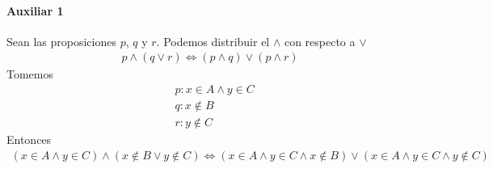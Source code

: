 \begin{enumerate}[label=\roman*)]
  \paragraph{Auxiliar 1}{
    Sean las proposiciones $p$, $q$ y $r$. Podemos distribuir el $\land$ con respecto a $\lor$
    \begin{align*}
      p \land (q \lor r) \iff (p \land q) \lor (p \land r)
    \end{align*}
    Tomemos 
    \begin{align*}
      &p: x \in A \land y \in C \\
      &q: x \notin B \\ 
      &r: y \notin C 
    \end{align*}
    Entonces
    \begin{align*}
      (x \in A \land y \in C) \land (x \notin B \lor y \notin C) \iff 
      (x \in A \land y \in C \land x \notin B) \lor (x \in A \land y \in C \land y \notin C)
    \end{align*}
  }

\end{enumerate}
